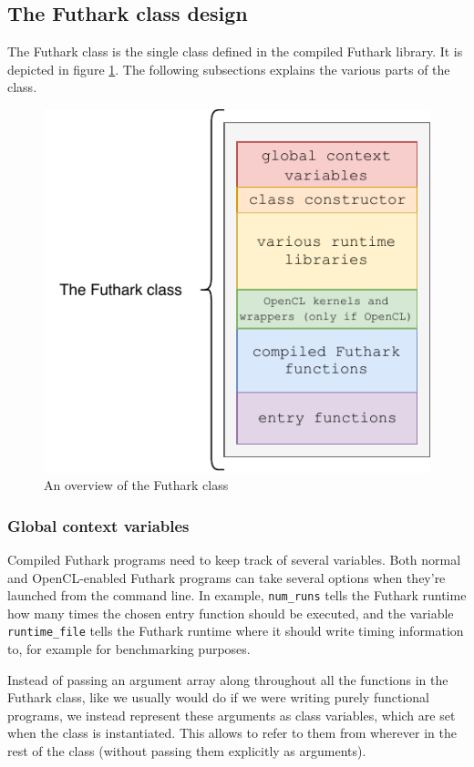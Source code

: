 \subsection{The Futhark class design}
\label{subsec:futharkclass}
The Futhark class is the single class defined in the compiled Futhark library.
It is depicted in figure \ref{fig:futharkclass}. 
The following subsections explains the various parts of the class.
\begin{figure}[h]
  \centering
  \includegraphics{chapters/figs/csharp/futhark_class.pdf}
  \caption{An overview of the Futhark class}
  \label{fig:futharkclass}
\end{figure}


\subsubsection{Global context variables}
\label{globalcontextvariables}
Compiled Futhark programs need to keep track of several variables.
Both normal and OpenCL-enabled Futhark \csharp{} programs can take several
options when they're launched from the command line. In example,
\texttt{num\_runs} tells the Futhark runtime how many times the chosen entry
function should be executed, and the variable \texttt{runtime\_file} tells the
Futhark runtime where it should write timing information to, for example for
benchmarking purposes.

Instead of passing an argument array along throughout all the functions in the
Futhark class, like we usually would do if we were writing purely functional
programs, we instead represent these arguments as class variables, which 
are set when the class is instantiated. 
This allows to refer to them from wherever in the rest of the class
(without passing them explicitly as arguments).

